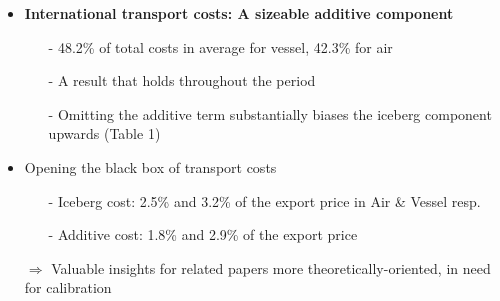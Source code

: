 \documentclass[10 pt,Helvetica, french]{beamer}
\begin{document}
\begin{frame}
\begin{itemize}
\item \textbf{International transport costs: A sizeable additive component}  \vspace{0.2cm}
\begin{itemize}
\item[-] 48.2\% of total costs in average for vessel, 42.3\% for air  \vspace{0.1cm}
\item[-] A result that holds throughout the period \hyperlink{slide_fig1}{} \vspace{0.1cm}
\item[-] Omitting the additive term substantially biases the iceberg component upwards (Table 1) \vspace{0.2cm}
\end{itemize}
\item Opening the black box of transport costs \vspace{0.1cm}
\begin{itemize}
\item[-] Iceberg cost: 2.5\% and 3.2\% of the export price in Air \& Vessel resp.  
\item[-] Additive cost: 1.8\% and 2.9\% of the export price \vspace{0.1cm}
\end{itemize}
\item[$\Rightarrow$] Valuable insights for related papers more theoretically-oriented, in need for calibration
\end{itemize}
\end{frame}
\end{document}
